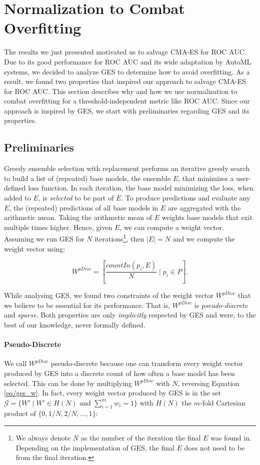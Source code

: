 \documentclass[11pt]{article}
\newcommand{\nbc}[3]{
		{\colorbox{#3}{\bfseries\sffamily\scriptsize\textcolor{white}{#1}}}
		{\textcolor{#3}{\sf\small$\blacktriangleright$\textit{#2}$\blacktriangleleft$}}
}
\newcommand{\changed}[1]{\nbc{CHANGED}{#1}{changedcolor}}
\renewcommand{\changed}[1]{{\color{changedcolor}#1}}
\renewcommand{\changed}[1]{{#1}}
\begin{document}
\section{Normalization to Combat Overfitting}
The results we just presented motivated us to salvage CMA-ES for ROC AUC.
\changed{Due to its good performance for ROC AUC and its wide adaptation by AutoML systems, we decided to analyze GES to determine how to avoid overfitting.
As a result, we found two properties that inspired our approach to salvage CMA-ES for ROC AUC.
This} section describes why and how we use normalization to combat overfitting for a threshold-independent metric like ROC AUC. 
Since our approach is inspired by GES, we start with preliminaries regarding GES and its properties. 
 
\subsection{Preliminaries}
\label{sec/ges_prem}
Greedy ensemble selection with replacement \citep{caruana2004, caruana2006} performs an iterative greedy search to build a list of (repeated) base models, the ensemble $E$, that minimizes a user-defined loss function. 
In each iteration, the base model minimizing the loss, when added to $E$, is \emph{selected} to be part of $E$. 
To produce predictions and evaluate any $E$, the (repeated) predictions of all base models in $E$ are aggregated with the arithmetic mean.
Taking the arithmetic mean of $E$ weights base models that exit multiple times higher.
Hence, given $E$, we can compute a weight vector. 
Assuming we run GES for $N$ iterations\footnote{
We always denote $N$ as the number of the iteration the final $E$ was found in. Depending on the implementation of GES, the final $E$ does not need to be from the final iteration. 
}, then $|E| = N$ and we compute the weight vector using:

\begin{equation}
    W^{pDisc} = \left[\frac{countIn(p_i, E)}{N} \; \bigg| \; p_i \in P \right].
    \label{eq/ges_w}
\end{equation}

While analysing GES, we found two constraints of the weight vector $W^{pDisc}$ that we believe to be essential for its performance. 
That is, $W^{pDisc}$ is \emph{pseudo-discrete} and \emph{sparse}. 
Both properties are only \emph{implicitly} respected by GES and were, to the best of our knowledge, never formally defined.  

\paragraph{Pseudo-Discrete}
We call $W^{pDisc}$ pseudo-discrete because one can transform every weight vector produced by GES into a discrete count of how often a base model has been selected.
This can be done by multiplying $W^{pDisc}$ with $N$,
reversing Equation \ref{eq/ges_w}.
In fact, every weight vector produced by GES is in the set $\mathcal{G} = \{W' \; | \; W' \in H(N) \text{ and } \sum_{i=1}^{m} w_i = 1\}$ with $H(N)$ the $m$-fold Cartesian product of $\{0, 1/N, 2/N, . . . , 1\}$:
\end{document}
